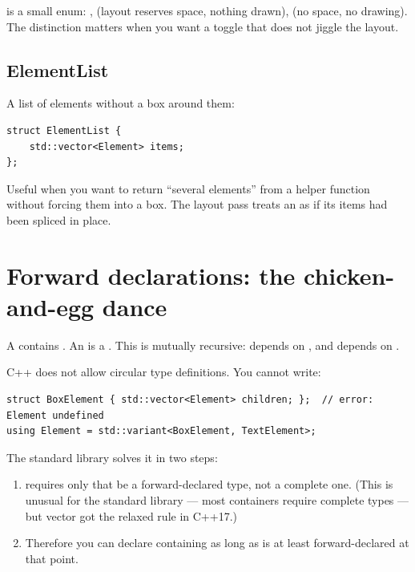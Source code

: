  is a small enum: , 
(layout reserves space, nothing drawn),  (no
space, no drawing). The distinction matters when you want a
toggle that does not jiggle the layout.

\subsection*{ElementList}

A list of elements without a box around them:

\begin{lstlisting}
struct ElementList {
    std::vector<Element> items;
};
\end{lstlisting}

Useful when you want to return ``several elements'' from a helper
function without forcing them into a box. The layout pass treats
an  as if its items had been spliced in place.

\section{Forward declarations: the chicken-and-egg dance}

A  contains . An
 is a .
This is mutually recursive:  depends on
, and  depends on
.

C++ does not allow circular type definitions. You cannot write:

\begin{lstlisting}
struct BoxElement { std::vector<Element> children; };  // error: Element undefined
using Element = std::variant<BoxElement, TextElement>;
\end{lstlisting}

The standard library solves it in two steps:

\begin{enumerate}[leftmargin=*]
  \item {} requires only that  be a
    forward-declared type, not a complete one. (This is unusual
    for the standard library --- most containers require complete
    types --- but vector got the relaxed rule in C++17.)
  \item Therefore you can declare  containing
     as long as  is at
    least forward-declared at that point.
\end{enumerate}

